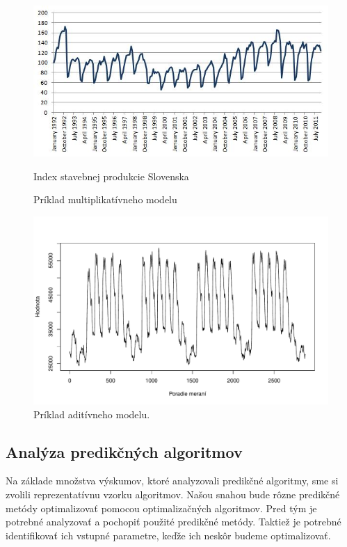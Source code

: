 \documentclass[a4paper,slovak,12pt,appendix]{article}
\begin{document}
\begin{figure}[!ht]
  \centering
  \includegraphics[width=\textwidth]{multi_model.jpg}
  \caption{Príklad multiplikatívneho modelu}
  \label{fig-multi-model}
  \small
  Index stavebnej produkcie Slovenska
\end{figure}

\begin{figure}[!ht]
  \centering
  \includegraphics[width=\textwidth]{add_model.pdf}
  \caption{Príklad aditívneho modelu.}
  \label{fig-add-model}
\end{figure}


\subsection{Analýza predikčných algoritmov}
Na základe množstva výskumov, ktoré analyzovali predikčné algoritmy, sme si
zvolili reprezentatívnu vzorku algoritmov. Našou snahou bude rôzne predikčné
metódy optimalizovať pomocou optimalizačných algoritmov. Pred tým je potrebné
analyzovať a pochopiť použité predikčné metódy. Taktiež je potrebné
identifikovať ich vstupné parametre, keďže ich neskôr budeme optimalizovať.
\end{document}

